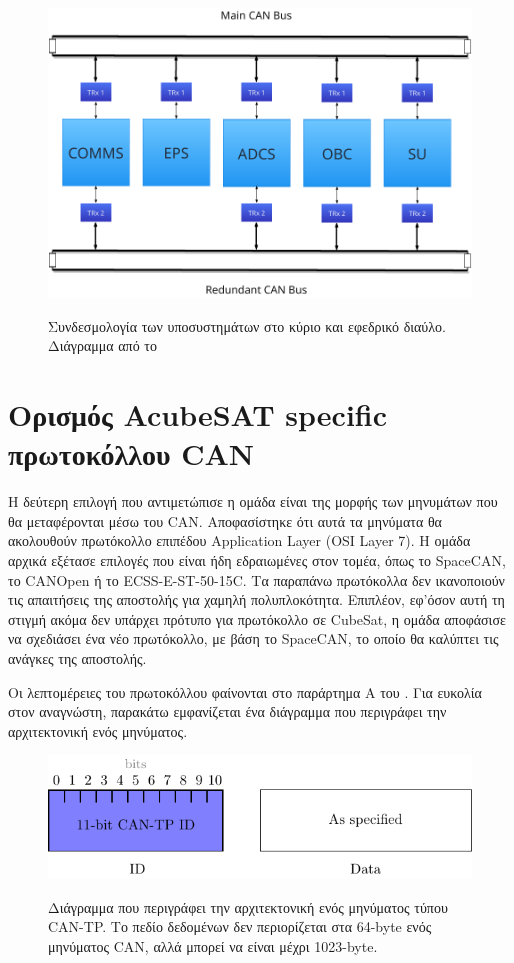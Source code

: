 \documentclass[a4paper,nobib,justified]{tufte-book}
\begin{document}
\begin{figure}[h]
	\includegraphics[width=0.8\linewidth]{media/diagrams/subsystems-on-buses.pdf}
	\label{fig:dual-buses}
	\caption[Συνδεσμολογία των υποσυστημάτων στους διαύλους]{Συνδεσμολογία των υποσυστημάτων στο κύριο και εφεδρικό διαύλο. Διάγραμμα από το \cite{DDJF_OBDH}}
\end{figure}

\section{Ορισμός AcubeSAT specific πρωτοκόλλου CAN}
Η δεύτερη επιλογή που αντιμετώπισε η ομάδα είναι της μορφής των μηνυμάτων που θα μεταφέρονται μέσω του CAN. Αποφασίστηκε ότι αυτά τα μηνύματα θα ακολουθούν πρωτόκολλο επιπέδου Application Layer (OSI Layer 7). Η ομάδα αρχικά εξέτασε επιλογές που είναι ήδη εδραιωμένες στον τομέα, όπως το SpaceCAN, το CANOpen ή το ECSS-E-ST-50-15C. Τα παραπάνω πρωτόκολλα δεν ικανοποιούν τις απαιτήσεις της αποστολής για χαμηλή πολυπλοκότητα. Επιπλέον, εφ'όσον αυτή τη στιγμή ακόμα δεν υπάρχει πρότυπο για πρωτόκολλο σε CubeSat, η ομάδα αποφάσισε να σχεδιάσει ένα νέο πρωτόκολλο, με βάση το SpaceCAN, το οποίο θα καλύπτει τις ανάγκες της αποστολής.

Οι λεπτομέρειες του πρωτοκόλλου φαίνονται στο παράρτημα Α του . Για ευκολία στον αναγνώστη, παρακάτω εμφανίζεται ένα διάγραμμα που περιγράφει την αρχιτεκτονική ενός μηνύματος.

\begin{figure}[h]
	\includegraphics[width=0.6\linewidth]{media/diagrams/tp-message-structure.pdf}
	\label{fig:tp-message-structure}
	\caption[Αρχιτεκτονική ενός μηνύματος τύπου CAN-TP.]{Διάγραμμα που περιγράφει την αρχιτεκτονική ενός μηνύματος τύπου CAN-TP. Το πεδίο δεδομένων δεν περιορίζεται στα 64-byte ενός μηνύματος CAN, αλλά μπορεί να είναι μέχρι 1023-byte.}
\end{figure}
\FloatBarrier
\end{document}
